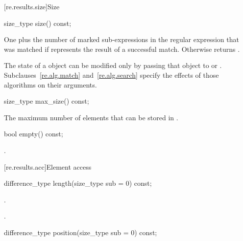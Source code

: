 [re.results.size]{Size}

%
\begin{itemdecl}
size_type size() const;
\end{itemdecl}

\begin{itemdescr}
\pnum
\returns
One plus the number of marked sub-expressions in the
regular expression that was matched if  represents the
result of a successful match.  Otherwise returns .
\begin{note}
The state of a  object can be modified
only by passing that object to  or .
Subclauses~\ref{re.alg.match} and~\ref{re.alg.search} specify the
effects of those algorithms on their  arguments.
\end{note}
\end{itemdescr}

%
\begin{itemdecl}
size_type max_size() const;
\end{itemdecl}

\begin{itemdescr}
\pnum
\returns
The maximum number of  elements that can be
stored in .
\end{itemdescr}

%
\begin{itemdecl}
bool empty() const;
\end{itemdecl}

\begin{itemdescr}
\pnum
\returns
{}.
\end{itemdescr}

[re.results.acc]{Element access}

%
\begin{itemdecl}
difference_type length(size_type sub = 0) const;
\end{itemdecl}

\begin{itemdescr}
\pnum
\expects
{}.

\pnum
\returns
{}.
\end{itemdescr}

%
\begin{itemdecl}
difference_type position(size_type sub = 0) const;
\end{itemdecl}

